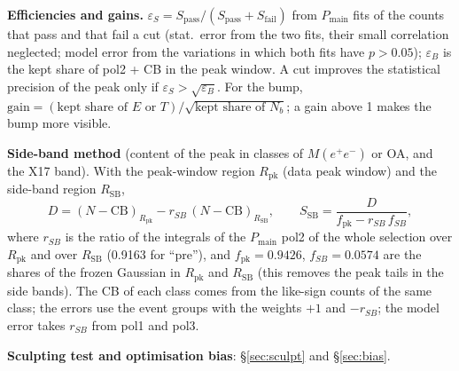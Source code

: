 \documentclass[11pt,a4paper]{article}
\newcommand{\Mee}{\ensuremath{M(e^{+}e^{-})}\xspace}
\newcommand{\Pmain}{\ensuremath{P_{\mathrm{main}}}\xspace}
\begin{document}
\textbf{Efficiencies and gains.} $\varepsilon_S=S_{\mathrm{pass}}/(S_{\mathrm{pass}}+S_{\mathrm{fail}})$ from
\Pmain fits of the counts that pass and that fail a cut (stat.\ error from the two fits, their small correlation
neglected; model error from the variations in which both fits have $p>0.05$); $\varepsilon_B$ is the kept share
of pol2 + CB in the peak window. A cut improves the statistical precision of the peak only if
$\varepsilon_S>\sqrt{\varepsilon_B}$. For the bump, $\mathrm{gain}=(\text{kept share of }E\text{ or }T)/\sqrt{\text{kept share of }N_b}$;
a gain above 1 makes the bump more visible.

\textbf{Side-band method} (content of the peak in classes of \Mee or OA, and the X17 band). With the peak-window
region $R_{\mathrm{pk}}$ (data peak window) and the side-band region $R_{\mathrm{SB}}$,
\begin{equation}
D=(N-\mathrm{CB})_{R_{\mathrm{pk}}}-r_{SB}\,(N-\mathrm{CB})_{R_{\mathrm{SB}}},\qquad S_{\mathrm{SB}}=\frac{D}{f_{\mathrm{pk}}-r_{SB}\,f_{SB}},
\label{eq:sb}
\end{equation}
where $r_{SB}$ is the ratio of the integrals of the \Pmain pol2 of the whole selection over $R_{\mathrm{pk}}$ and over $R_{\mathrm{SB}}$
(0.9163 for ``pre''), and $f_{\mathrm{pk}}=0.9426$, $f_{SB}=0.0574$ are the shares of the frozen Gaussian in $R_{\mathrm{pk}}$ and $R_{\mathrm{SB}}$
(this removes the peak tails in the side bands). The CB of each class comes from the like-sign counts of the same
class; the errors use the event groups with the weights $+1$ and $-r_{SB}$; the model error takes $r_{SB}$ from
pol1 and pol3.

\textbf{Sculpting test and optimisation bias}: \S\ref{sec:sculpt} and \S\ref{sec:bias}.
\end{document}

